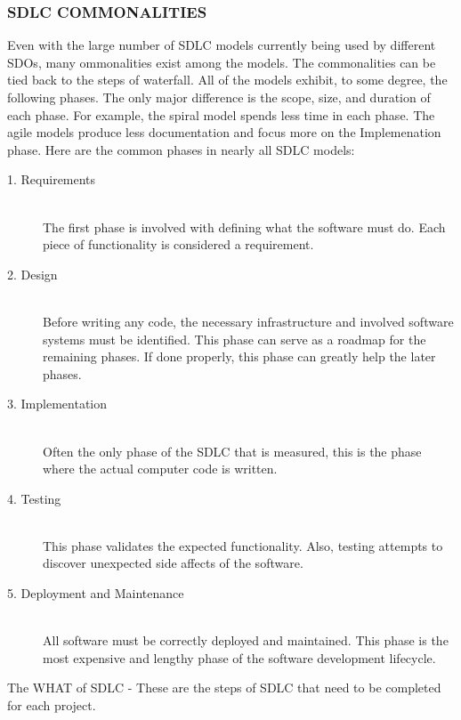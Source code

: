 \documentclass[SDSUThesis.tex]{subfiles}
\begin{document}
    \subsubsection{SDLC COMMONALITIES}
        Even with the large number of SDLC models currently being used by different SDOs,
        many ommonalities exist among the models.  The 
        commonalities can be tied back to the steps of waterfall.  All of the models
        exhibit, to some degree, the following phases. The only major difference is 
        the scope, size, and duration of each phase.  For example, the spiral
        model spends less time in each phase.  The agile models produce less
        documentation and focus more on the Implemenation phase. Here are
        the common phases in nearly all SDLC models:
        \begin{description}
            \item[1. Requirements] \hfill \\ The first phase is involved 
                with defining what the software must do.  Each piece of 
                functionality is considered a requirement.  
            \item[2. Design] \hfill \\ Before writing any code, the 
                necessary infrastructure and involved software systems
                must be identified. This phase can serve as a roadmap for the 
                remaining phases. If done properly, this phase can greatly 
                help the later phases.
            \item[3. Implementation] \hfill \\ Often the only phase of the SDLC 
                that is measured, this is the phase where the actual computer
                code is written.
            \item[4. Testing] \hfill \\ This phase validates the expected 
                functionality.  Also, testing attempts to discover unexpected
                side affects of the software.
            \item[5. Deployment and Maintenance] \hfill \\ All software must 
                be correctly deployed and maintained.  This phase is the 
                most expensive and lengthy phase of the software
                development lifecycle.
        \end{description}
        
        
The WHAT of SDLC - These are the steps of SDLC that need to be completed for each project.
\end{document}
